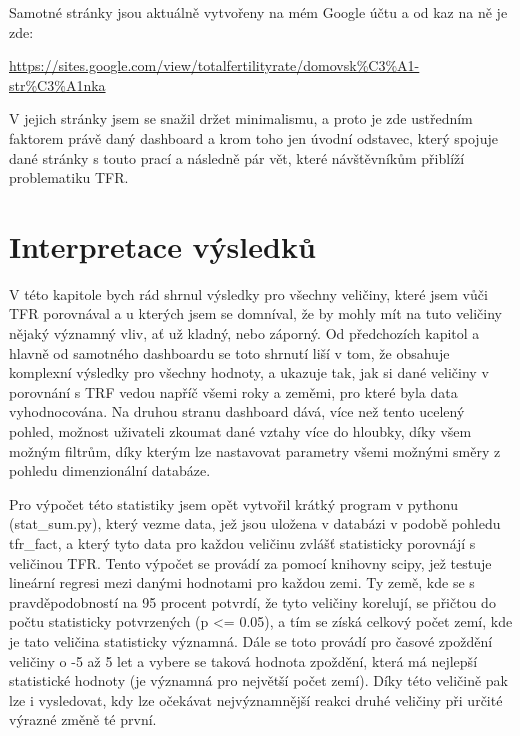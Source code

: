 \documentclass[thesis=M,czech]{FITthesis}[2022/10/08]
\begin{document}
Samotné stránky jsou aktuálně vytvořeny na mém Google účtu a od kaz na ně je zde: 

\url{https://sites.google.com/view/totalfertilityrate/domovsk%C3%A1-str%C3%A1nka}

V jejich stránky jsem se snažil držet minimalismu, a proto je zde ustředním faktorem právě daný dashboard a krom toho jen úvodní odstavec, který spojuje dané stránky s touto prací a následně pár vět, které návštěvníkům přiblíží problematiku TFR.

\section{Interpretace výsledků}
V této kapitole bych rád shrnul výsledky pro všechny veličiny, které jsem vůči TFR porovnával a u kterých jsem se domníval, že by mohly mít na tuto veličiny nějaký významný vliv, ať už kladný, nebo záporný. Od předchozích kapitol a hlavně od samotného dashboardu se toto shrnutí liší v tom, že obsahuje komplexní výsledky pro všechny hodnoty, a ukazuje tak, jak si dané veličiny v porovnání s TRF vedou napříč všemi roky a zeměmi, pro které byla data vyhodnocována. Na druhou stranu dashboard dává, více než tento ucelený pohled, možnost uživateli zkoumat dané vztahy více do hloubky, díky všem možným filtrům, díky kterým lze nastavovat parametry všemi možnými směry z pohledu dimenzionální databáze.

Pro výpočet této statistiky jsem opět vytvořil krátký program v pythonu (stat\_sum.py), který vezme data, jež jsou uložena v databázi v podobě pohledu tfr\_fact, a  který tyto data pro každou veličinu zvlášť statisticky porovnájí s veličinou TFR. Tento výpočet se provádí za pomocí knihovny scipy, jež testuje lineární regresi mezi danými hodnotami pro každou zemi. Ty země, kde se s pravděpodobností na 95 procent potvrdí, že tyto veličiny korelují, se přičtou do počtu statisticky potvrzených (p <= 0.05), a tím se získá celkový počet zemí, kde je tato veličina statisticky významná. Dále se toto provádí pro časové zpoždění veličiny o -5 až 5 let a vybere se taková hodnota zpoždění, která má nejlepší statistické hodnoty (je významná pro největší počet zemí). Díky této veličině pak lze i vysledovat, kdy lze očekávat nejvýznamnější reakci druhé veličiny při určité výrazné změně té první.  
\end{document}

